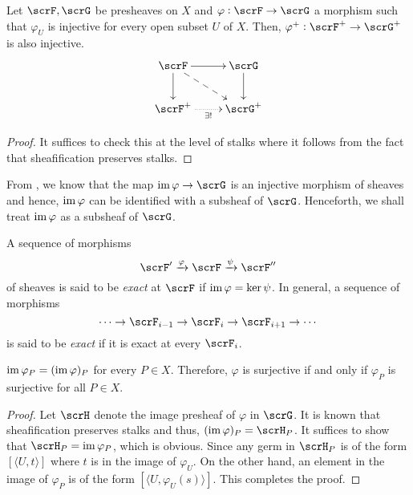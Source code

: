 \begin{lemma}
    Let $\scrF, \scrG$ be presheaves on $X$ and $\varphi:\scrF\to\scrG$ a morphism such that $\varphi_U$ is injective for every open subset $U$ of $X$. Then, $\varphi^+: \scrF^+\to\scrG^+$ is also injective.
    \begin{equation*}
        \xymatrix {
            \scrF\ar[r]\ar[d]\ar@{-->}[rd] & \scrG\ar[d]\\
            \scrF^+\ar@{.>}[r]_{\exists!} & \scrG^+
        }
    \end{equation*}
\end{lemma}
\begin{proof}
    It suffices to check this at the level of stalks where it follows from the fact that sheafification preserves stalks.
\end{proof}

\begin{remark}
    From , we know that the map $\im\varphi\to\scrG$ is an injective morphism of sheaves and hence, $\operatorname{im}\varphi$ can be identified with a subsheaf of $\scrG$. Henceforth, we shall treat $\operatorname{im}\varphi$ as a subsheaf of $\scrG$.
\end{remark}

\begin{definition}
    A sequence of morphisms 
    \begin{equation*}
        \scrF'\xrightarrow{\varphi}\scrF\xrightarrow{\psi}\scrF''
    \end{equation*}
    of sheaves is said to be \emph{exact} at $\scrF$ if $\operatorname{im}\varphi = \ker\psi$. In general, a sequence of morphisms 
    \begin{equation*}
        \cdots\rightarrow\scrF_{i - 1}\rightarrow\scrF_{i}\rightarrow\scrF_{i + 1}\rightarrow\cdots
    \end{equation*}
    is said to be \emph{exact} if it is exact at every $\scrF_i$.
\end{definition}

\begin{proposition}
    $\operatorname{im}\varphi_P = (\operatorname{im}\varphi)_P$ for every $P\in X$. Therefore, $\varphi$ is surjective if and only if $\varphi_P$ is surjective for all $P\in X$.
\end{proposition}
\begin{proof}
    Let $\scrH$ denote the image presheaf of $\varphi$ in $\scrG$. It is known that sheafification preserves stalks and thus, $(\im\varphi)_P = \scrH_P$. It suffices to show that $\scrH_P = \im\varphi_P$, which is obvious. Since any germ in $\scrH_P$ is of the form $[\langle U, t\rangle]$ where $t$ is in the image of $\varphi_U$. On the other hand, an element in the image of $\varphi_P$ is of the form $[\langle U, \varphi_U(s)\rangle]$. This completes the proof.
\end{proof}

